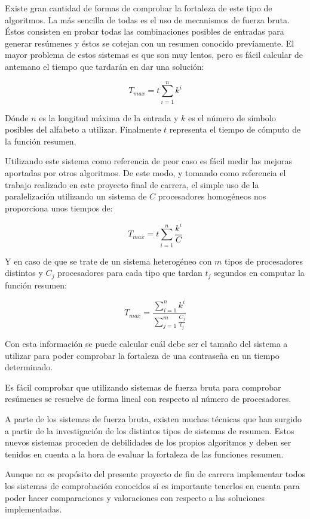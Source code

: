 Existe gran cantidad de formas de comprobar la fortaleza de este tipo de algoritmos. La más sencilla de todas es el uso de mecanismos de fuerza bruta. Éstos consisten en probar todas las combinaciones posibles de entradas para generar resúmenes y éstos se cotejan con un resumen conocido previamente. El mayor problema de estos sistemas es que son muy lentos, pero es fácil calcular de antemano el tiempo que tardarán en dar una solución:

$$ T_{max}=t\sum^n_{i=1}k^i $$
 
Dónde $n$ es la longitud máxima de la entrada y $k$ es el número de símbolo posibles del alfabeto a utilizar. Finalmente $t$ representa el tiempo de cómputo de la función resumen.

Utilizando este sistema como referencia de peor caso es fácil medir las mejoras aportadas por otros algoritmos. De este modo, y tomando como referencia el trabajo realizado en este proyecto final de carrera, el simple uso de la paralelización utilizando un sistema de $C$ procesadores homogéneos nos proporciona unos tiempos de:

$$ T_{max}=t\sum^n_{i=1}\frac{k^i}{C} $$
 
Y en caso de que se trate de un sistema heterogéneo con $m$ tipos de procesadores distintos y $C_j$ procesadores para cada tipo que tardan $t_j$ segundos en computar la función resumen:

$$ T_{max}=\frac{\sum^n_{i=1}k^i}{\sum^m_{j=1}\frac{C_j}{t_j}}$$
 
Con esta información  se puede calcular cuál debe ser el tamaño del sistema a utilizar para poder comprobar la fortaleza de una contraseña en un tiempo determinado.

Es fácil comprobar que utilizando sistemas de fuerza bruta para comprobar resúmenes se resuelve de forma lineal con respecto al número de procesadores.

A parte de los sistemas de fuerza bruta, existen muchas técnicas que han surgido a partir de la investigación de los distintos tipos de sistemas de resumen. Estos nuevos sistemas proceden de debilidades de los propios algoritmos y deben ser tenidos en cuenta a la hora de evaluar la fortaleza de las funciones resumen.

Aunque no es propósito del presente proyecto de fin de carrera implementar todos los sistemas de comprobación conocidos sí es importante tenerlos en cuenta para poder hacer comparaciones y valoraciones con respecto a las soluciones implementadas.


